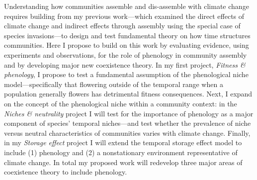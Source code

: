 Understanding how communities assemble and dis-assemble with climate change requires building from my previous work---which examined the direct effects of climate change and indirect effects through assembly using the special case of species invasions---to design and test fundamental theory on how time structures communities. Here I propose to build on this work by evaluating evidence, using experiments and observations, for the role of phenology in community assembly and by developing major new coexistence theory. In my first project, \emph{Fitness \& phenology}, I propose to test a fundamental assumption of the phenological niche model---specifically that flowering outside of the temporal range when a population generally flowers has detrimental fitness consequences. Next, I expand on the concept of the phenological niche within a community context: in the \emph{Niches \& neutrality} project I will test for the importance of phenology as a major component of species' temporal niches---and test whether the prevalence of niche versus neutral characteristics of communities varies with climate change. Finally, in my \emph{Storage effect} project I will extend the temporal storage effect model to include (1) phenology and (2) a nonstationary environment representative of climate change. In total my proposed work will redevelop three major areas of coexistence theory to include phenology.
\vspace{1.5ex}\\